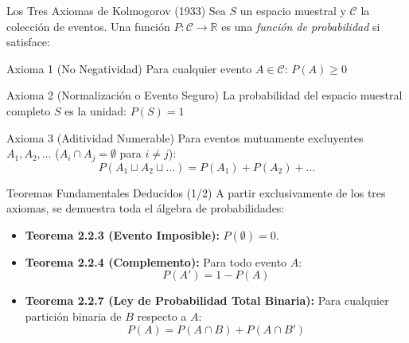 \documentclass[10pt,aspectratio=169]{beamer}
\begin{document}
\begin{frame}{Los Tres Axiomas de Kolmogorov (1933)}
  \small Sea $S$ un espacio muestral y $\mathcal{C}$ la colección de eventos. Una función $P: \mathcal{C} \to \mathbb{R}$ es una \emph{función de probabilidad} si satisface: \pause

  \vspace{0.2em}
  \begin{block}{Axioma 1 (No Negatividad)}
    Para cualquier evento $A \in \mathcal{C}$: $P(A) \geq 0$
  \end{block}

  \vspace{0.1em}
  \pause
  \begin{block}{Axioma 2 (Normalización o Evento Seguro)}
    La probabilidad del espacio muestral completo $S$ es la unidad: $P(S) = 1$
  \end{block}

  \vspace{0.1em}
  \pause
  \begin{block}{Axioma 3 (Aditividad Numerable)}
    Para eventos mutuamente excluyentes $A_1, A_2, \dots$ ($A_i \cap A_j = \emptyset$ para $i \neq j$):
    $$P(A_1 \sqcup A_2 \sqcup \dots) = P(A_1) + P(A_2) + \dots$$
  \end{block}
\end{frame}

\begin{frame}{Teoremas Fundamentales Deducidos (1/2)}
  A partir exclusivamente de los tres axiomas, se demuestra toda el álgebra de probabilidades: \pause

  \vspace{0.4em}
  \begin{itemize}
    \item \textbf{Teorema 2.2.3 (Evento Imposible):} $P(\emptyset) = 0$. \pause
    \vspace{0.3em}
    \item \textbf{Teorema 2.2.4 (Complemento):} Para todo evento $A$:
    $$P(A') = 1 - P(A)$$ \pause
    \vspace{0.3em}
    \item \textbf{Teorema 2.2.7 (Ley de Probabilidad Total Binaria):} Para cualquier partición binaria de $B$ respecto a $A$:
    $$P(A) = P(A \cap B) + P(A \cap B')$$
  \end{itemize}
\end{frame}
\end{document}
